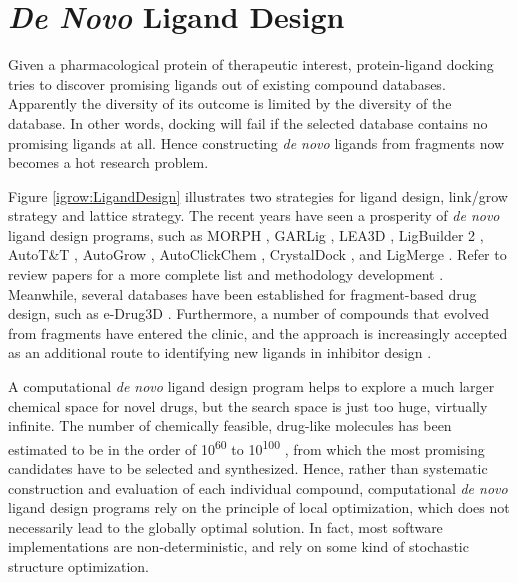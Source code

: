 \section{\textit{De Novo} Ligand Design}

Given a pharmacological protein of therapeutic interest, protein-ligand docking tries to discover promising ligands out of existing compound databases. Apparently the diversity of its outcome is limited by the diversity of the database. In other words, docking will fail if the selected database contains no promising ligands at all. Hence constructing \textit{de novo} ligands from fragments now becomes a hot research problem.

Figure \ref{igrow:LigandDesign} \citep{363} illustrates two strategies for ligand design, link/grow strategy and lattice strategy. The recent years have seen a prosperity of \textit{de novo} ligand design programs, such as MORPH \citep{365}, GARLig \citep{471}, LEA3D \citep{1223}, LigBuilder 2 \citep{749}, AutoT\&T \citep{780}, AutoGrow \citep{466}, AutoClickChem \citep{1051}, CrystalDock \citep{954}, and LigMerge \citep{1181}. Refer to review papers for a more complete list \citep{363,367,472,1006} and methodology development \citep{470,982}. Meanwhile, several databases have been established for fragment-based drug design, such as e-Drug3D \citep{1125}. Furthermore, a number of compounds that evolved from fragments have entered the clinic, and the approach is increasingly accepted as an additional route to identifying new ligands in inhibitor design \citep{363,367,472,474,1006}.

A computational \textit{de novo} ligand design program helps to explore a much larger chemical space for novel drugs, but the search space is just too huge, virtually infinite. The number of chemically feasible, drug-like molecules has been estimated to be in the order of 10\textsuperscript{60} to 10\textsuperscript{100} \citep{1104}, from which the most promising candidates have to be selected and synthesized. Hence, rather than systematic construction and evaluation of each individual compound, computational \textit{de novo} ligand design programs rely on the principle of local optimization, which does not necessarily lead to the globally optimal solution. In fact, most software implementations are non-deterministic, and rely on some kind of stochastic structure optimization.


